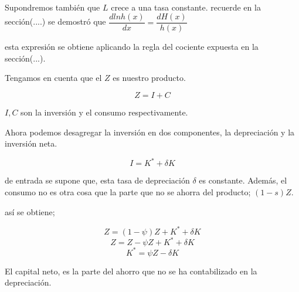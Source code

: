 \documentclass[12pt]{article}
\begin{document}
\

Supondremos también que $L$ crece a una tasa constante.  recuerde en la sección(....) se demostró que $\dfrac{dln h(x)}{dx}=\dfrac{dH(x)}{h(x)}$




esta expresión se obtiene aplicando la regla del cociente expuesta en la sección(...).




Tengamos en cuenta que el $Z$ es nuestro producto.

$$Z=I+C$$

$I,C$ son la inversión y el consumo respectivamente.

Ahora podemos desagregar la inversión en dos componentes, la depreciación y la inversión neta.

$$I=K^{*}+\delta K$$

de entrada se supone que, esta tasa de depreciación $\delta$ es constante. Además, el consumo no es otra cosa que la parte que no  se ahorra del producto; $(1-s)Z$.

así se obtiene;

$$Z= (1-\psi)Z+K^{*}+\delta K$$
$$Z=Z-\psi Z +K^{*}+\delta K$$
$$K^{*}= \psi Z - \delta K $$

El capital neto, es la parte del ahorro  que no se ha contabilizado en la depreciación. 
\end{document}
